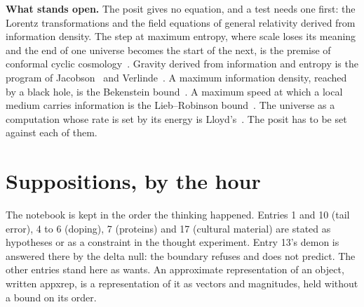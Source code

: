\textbf{What stands open.} The posit gives no equation, and a test needs one first: the Lorentz
transformations and the field equations of general relativity derived from information density. The
step at maximum entropy, where scale loses its meaning and the end of one universe becomes the start
of the next, is the premise of conformal cyclic cosmology~\cite{src:Penrose-2010}. Gravity derived
from information and entropy is the program of Jacobson~\cite{src:Jacobson-1995} and
Verlinde~\cite{src:Verlinde-2011}. A maximum information density, reached by a black hole, is the
Bekenstein bound~\cite{src:Bekenstein-1981}. A maximum speed at which a local medium carries
information is the Lieb--Robinson bound~\cite{src:Lieb-and-Robinson-1972}. The universe as a
computation whose rate is set by its energy is Lloyd's~\cite{src:Lloyd-2002}. The posit has to be set
against each of them.

\section{Suppositions, by the hour}

The notebook is kept in the order the thinking happened. Entries 1 and 10 (tail error), 4 to 6
(doping), 7 (proteins) and 17 (cultural material) are stated as hypotheses or as a constraint in the
thought experiment. Entry 13's demon is answered there by the delta null: the boundary refuses and
does not predict. The other entries stand here as wants. An approximate representation of an object,
written appxrep, is a representation of it as vectors and magnitudes, held without a bound on its
order.

